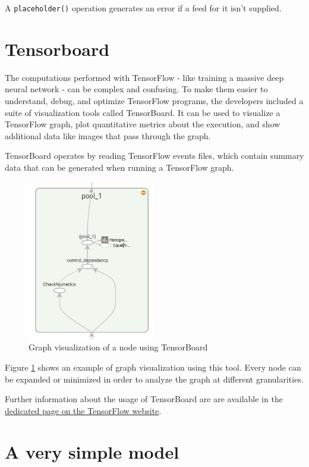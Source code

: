 A \lstinline|placeholder()| operation generates an error if a feed for it isn't supplied.

\section{Tensorboard}

The computations performed with TensorFlow - like training a massive deep neural network - can be complex and confusing. To make them easier to understand, debug, and optimize TensorFlow programs, the developers included a suite of visualization tools called TensorBoard. It can be used to visualize a TensorFlow graph, plot quantitative metrics about the execution, and show additional data like images that pass through the graph.

TensorBoard operates by reading TensorFlow events files, which contain summary data that can be generated when running a TensorFlow graph.

\begin{figure}
	\centering
	\includegraphics[width=0.5\textwidth]{Images/tensorboard}
	\caption{Graph visualization of a node using TensorBoard}\label{fig:tensorboard}
\end{figure}

Figure \ref{fig:tensorboard} shows an example of graph visualization using this tool. Every node can be expanded or minimized in order to analyze the graph at different granularities.

Further information about the usage of TensorBoard are are available in the \href{https://www.tensorflow.org/how_tos/summaries_and_tensorboard/}{dedicated page on the TensorFlow website}.

\section{A very simple model}

